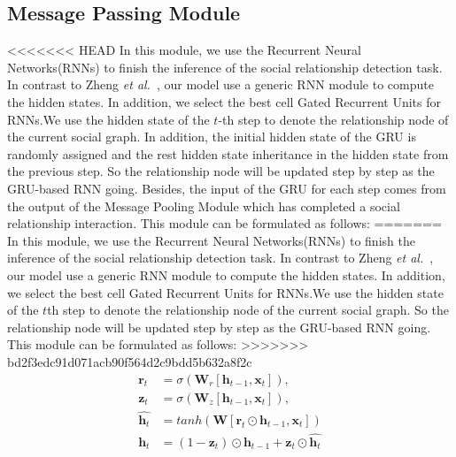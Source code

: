 \documentclass{article}
\newcommand{\etal}{{\it et al.}}
\begin{document}
\subsection{Message Passing Module} \label{section:RRNN}
<<<<<<< HEAD
In this module, we use the Recurrent Neural Networks(RNNs) to finish the inference of the social relationship detection task. In contrast to Zheng \etal \ \cite{DBLP:conf/iccv/0001JRVSDHT15}, our model use a generic RNN module to compute the hidden states. In addition, we select the best cell Gated Recurrent Units \cite{DBLP:conf/ssst/2014} for RNNs.We use the hidden state of the $t$-th step to denote the relationship node of the current social graph. In addition, the initial hidden state of the GRU is randomly assigned and the rest hidden state inheritance in the hidden state from the previous step. So the relationship node will be updated step by step as the GRU-based RNN going. Besides, the input of the GRU for each step comes from the output of the Message Pooling Module which has completed a social relationship interaction. This module can be formulated as follows:
=======
In this module, we use the Recurrent Neural Networks(RNNs) to finish the inference of the social relationship detection task. In contrast to Zheng \etal \ \cite{DBLP:conf/iccv/0001JRVSDHT15}, our model use a generic RNN module to compute the hidden states. In addition, we select the best cell Gated Recurrent Units \cite{DBLP:conf/ssst/ChoMBB14} for RNNs.We use the hidden state of the $t$th step to denote the relationship node of the current social graph. So the relationship node will be updated step by step as the GRU-based RNN going. This module can be formulated as follows:
>>>>>>> bd2f3edc91d071acb90f564d2c9bdd5b632a8f2c
\begin{equation}
\begin{split}
\bm{r}_t &=  \sigma(\bm{W}_{r}[\bm{h}_{t-1}, \bm{x}_t]), \\
\bm{z}_t &=  \sigma(\bm{W}_{z}[\bm{h}_{t-1}, \bm{x}_t]), \\
\hat{\bm{h}_t} &= tanh(\bm{W}[\bm{r}_t \odot \bm{h}_{t-1}, \bm{x}_{t}])\\
\bm{h}_t &= (1 - \bm{z}_t) \odot \bm{h}_{t - 1} + \bm{z}_t \odot \hat{\bm{h}_t} \\
\end{split}
\end{equation}
\end{document}
